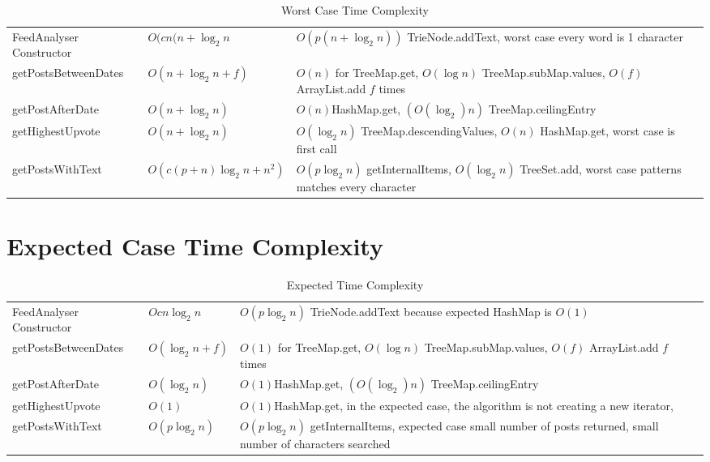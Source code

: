 \documentclass[11pt, oneside]{article}   	%
\begin{document}
\begin{table}[htp]
\caption{Worst Case Time Complexity}
\begin{center}
\begin{tabular}{l p{5 cm} p{5 cm}}

FeedAnalyser Constructor &  $O(c n (n + \log_2 n$ & $O(p (n + \log_2 n))$ TrieNode.addText, worst case every word is 1 character\\
getPostsBetweenDates &  $O(n + \log_2 n + f)$ & $O(n)$ for TreeMap.get, $O(\log n)$ TreeMap.subMap.values, $O(f)$ ArrayList.add $f$ times \\
getPostAfterDate & $O(n + \log_2n)$ & $O(n)$HashMap.get, $(O(\log_2) n)$ TreeMap.ceilingEntry \\
getHighestUpvote & $O(n + \log_2 n)$ & $O(\log_2 n)$ TreeMap.descendingValues, $O(n)$ HashMap.get, worst case is first call \\
getPostsWithText &  $O(c (p + n) \log_2 n + n^2)$ & $O(p \log_2 n)$ getInternalItems, $O(\log_2 n)$ TreeSet.add, worst case patterns matches every character \\

\end{tabular}
\end{center}
\label{default}
\end{table}

\section{Expected Case Time Complexity}


\begin{table}[htp]
\caption{Expected Time Complexity}
\begin{center}
\begin{tabular}{l p{5 cm} p{5 cm}}

FeedAnalyser Constructor &  $Oc n \log_2 n$ & $O(p \log_2 n)$ TrieNode.addText because expected HashMap is $O(1)$\\
getPostsBetweenDates &  $O(\log_2 n + f)$ & $O(1)$ for TreeMap.get, $O(\log n)$ TreeMap.subMap.values, $O(f)$ ArrayList.add $f$ times \\
getPostAfterDate & $O(\log_2n)$ & $O(1)$HashMap.get, $(O(\log_2) n)$ TreeMap.ceilingEntry \\
getHighestUpvote & $O(1)$ & $O(1)$HashMap.get, in the expected case, the algorithm is not creating a new iterator, \\
getPostsWithText &  $O(p \log_2 n)$ & $O(p \log_2 n)$ getInternalItems, expected case small number of posts returned, small number of characters searched \\

\end{tabular}
\end{center}
\label{default}
\end{table}
\end{document}
